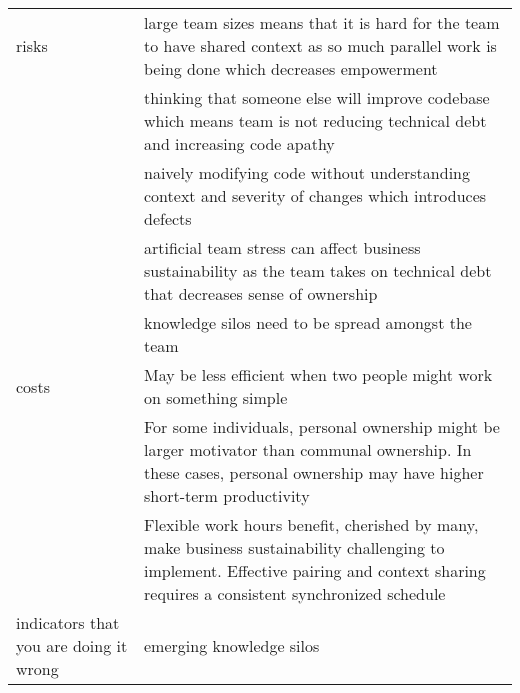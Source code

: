 \documentclass{sig-alternate-05-2015}
\begin{document}
\begin{table*}[t]
\begin{tabular}{p{1.1in}p{5.0in}}
\hline
risks              & large team sizes means that it is hard for the team to have shared context as so much parallel work is being done which decreases empowerment                                                  \\ 
                   & thinking that someone else will improve codebase which means team is not reducing technical debt and increasing code apathy                                                                    \\ 
                   & naively modifying code without understanding context and severity of changes which introduces defects                                                                                          \\ 
                   & artificial team stress can affect business sustainability as the team takes on technical debt that decreases sense of ownership                                                                \\ 
                   & knowledge silos need to be spread amongst the team                                                                                                                                             \\ 
\hline
costs              & May be less efficient when two people might work on something simple                                                                                                                           \\ 
                   & For some individuals, personal ownership might be larger motivator than communal ownership. In these cases, personal ownership may have higher short-term productivity                         \\ 
                   & Flexible work hours benefit, cherished by many, make business sustainability challenging to implement. Effective pairing and context sharing requires a consistent synchronized schedule       \\ 
\hline
indicators that you are doing it wrong   & emerging knowledge silos \\                                                                                                                                                                                                                                   
\hline
\end{tabular}
\end{table*}
\end{document}
